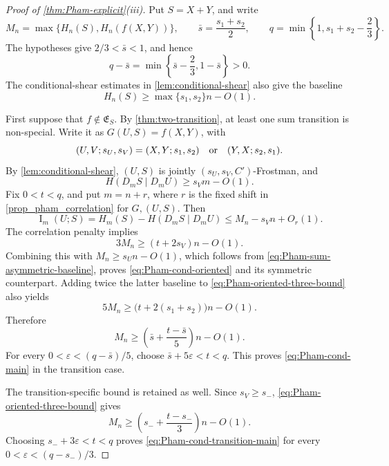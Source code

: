 \documentclass[11pt]{article}
\begin{document}
\begin{proof}[Proof of \cref{thm:Pham-explicit}\textup{(iii)}]
Put \(S=X+Y\), and write
\[
 M_n=\max\{H_n(S),H_n(f(X,Y))\},\qquad
 \bar s=\frac{s_1+s_2}{2},\qquad
 q=\min\left\{1,s_1+s_2-\frac{2}{3}\right\}.
\]
The hypotheses give \(2/3<\bar s<1\), and hence
\[
 q-\bar s=\min\left\{\bar s-\frac{2}{3},1-\bar s\right\}>0.
\]
The conditional-shear estimates in \cref{lem:conditional-shear}
also give the baseline
\begin{equation}
 H_n(S)\ge\max\{s_1,s_2\}n-O(1).
 \label{eq:Pham-sum-asymmetric-baseline}
\end{equation}

First suppose that \(f\notin\mathfrak E_S\).  By
\cref{thm:two-transition}, at least one sum transition is non-special.
Write it as \(G(U,S)=f(X,Y)\), with
\[
 (U,V;s_U,s_V)=(X,Y;s_1,s_2)
 \quad\hbox{or}\quad(Y,X;s_2,s_1).
\]
By \cref{lem:conditional-shear}, \((U,S)\) is jointly
\((s_U,s_V,C')\)-Frostman, and
\begin{equation}
 H(D_mS\mid D_mU)\ge s_Vm-O(1).
 \label{eq:Pham-transition-conditional-entropy}
\end{equation}
Fix \(0<t<q\), and put \(m=n+r\), where \(r\) is the fixed
shift in \cref{prop_pham_correlation} for \(G,(U,S)\).
Then
\[
 \operatorname{I}_m(U;S)
 =H_m(S)-H(D_mS\mid D_mU)
 \le M_n-s_Vn+O_r(1).
\]
The correlation penalty implies
\begin{equation}
 3M_n\ge(t+2s_V)n-O(1).
 \label{eq:Pham-oriented-three-bound}
\end{equation}
Combining this with \(M_n\ge s_Un-O(1)\), which follows from
\eqref{eq:Pham-sum-asymmetric-baseline}, proves
\eqref{eq:Pham-cond-oriented} and its symmetric counterpart.
Adding twice the latter baseline to
\eqref{eq:Pham-oriented-three-bound} also yields
\begin{equation}
 5M_n\ge\bigl(t+2(s_1+s_2)\bigr)n-O(1).
 \label{eq:Pham-asymmetric-five-bound}
\end{equation}
Therefore
\[
 M_n\ge\left(\bar s+\frac{t-\bar s}{5}\right)n-O(1).
\]
For every \(0<\varepsilon<(q-\bar s)/5\), choose
\(\bar s+5\varepsilon<t<q\).  This proves
\eqref{eq:Pham-cond-main} in the transition case.

The transition-specific bound is retained as well.  Since
\(s_V\ge s_-\), \eqref{eq:Pham-oriented-three-bound} gives
\[
 M_n\ge\left(s_-+\frac{t-s_-}{3}\right)n-O(1).
\]
Choosing \(s_-+3\varepsilon<t<q\) proves
\eqref{eq:Pham-cond-transition-main} for every
\(0<\varepsilon<(q-s_-)/3\).


\end{proof}
\end{document}
